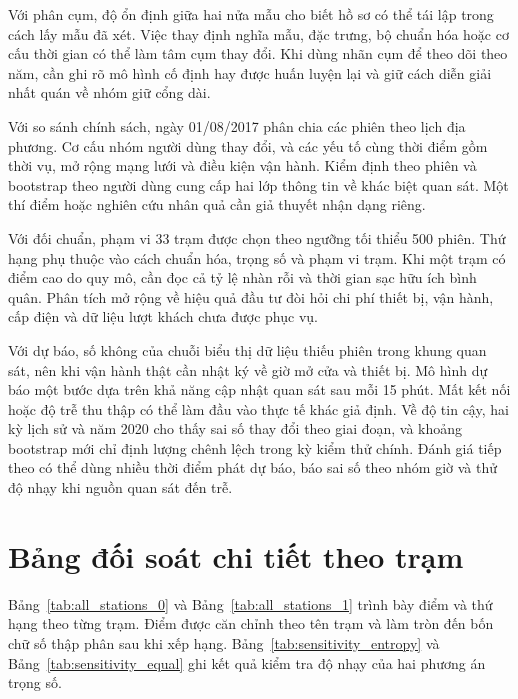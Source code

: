 \documentclass[conference,a4paper]{IEEEtran}
\begin{document}
Với phân cụm, độ ổn định giữa hai nửa mẫu cho biết hồ sơ có thể tái lập trong cách lấy mẫu đã xét. Việc thay định nghĩa mẫu, đặc trưng, bộ chuẩn hóa hoặc cơ cấu thời gian có thể làm tâm cụm thay đổi. Khi dùng nhãn cụm để theo dõi theo năm, cần ghi rõ mô hình cố định hay được huấn luyện lại và giữ cách diễn giải nhất quán về nhóm giữ cổng dài.

Với so sánh chính sách, ngày 01/08/2017 phân chia các phiên theo lịch địa phương. Cơ cấu nhóm người dùng thay đổi, và các yếu tố cùng thời điểm gồm thời vụ, mở rộng mạng lưới và điều kiện vận hành. Kiểm định theo phiên và bootstrap theo người dùng cung cấp hai lớp thông tin về khác biệt quan sát. Một thí điểm hoặc nghiên cứu nhân quả cần giả thuyết nhận dạng riêng.

Với đối chuẩn, phạm vi 33 trạm được chọn theo ngưỡng tối thiểu 500 phiên. Thứ hạng phụ thuộc vào cách chuẩn hóa, trọng số và phạm vi trạm. Khi một trạm có điểm cao do quy mô, cần đọc cả tỷ lệ nhàn rỗi và thời gian sạc hữu ích bình quân. Phân tích mở rộng về hiệu quả đầu tư đòi hỏi chi phí thiết bị, vận hành, cấp điện và dữ liệu lượt khách chưa được phục vụ.

Với dự báo, số không của chuỗi biểu thị dữ liệu thiếu phiên trong khung quan sát, nên khi vận hành thật cần nhật ký về giờ mở cửa và thiết bị. Mô hình dự báo một bước dựa trên khả năng cập nhật quan sát sau mỗi 15 phút. Mất kết nối hoặc độ trễ thu thập có thể làm đầu vào thực tế khác giả định. Về độ tin cậy, hai kỳ lịch sử và năm 2020 cho thấy sai số thay đổi theo giai đoạn, và khoảng bootstrap mới chỉ định lượng chênh lệch trong kỳ kiểm thử chính. Đánh giá tiếp theo có thể dùng nhiều thời điểm phát dự báo, báo sai số theo nhóm giờ và thử độ nhạy khi nguồn quan sát đến trễ.

\appendices
\section{Bảng đối soát chi tiết theo trạm}
Bảng~\ref{tab:all_stations_0} và Bảng~\ref{tab:all_stations_1} trình bày điểm và thứ hạng theo từng trạm. Điểm được căn chỉnh theo tên trạm và làm tròn đến bốn chữ số thập phân sau khi xếp hạng. Bảng~\ref{tab:sensitivity_entropy} và Bảng~\ref{tab:sensitivity_equal} ghi kết quả kiểm tra độ nhạy của hai phương án trọng số.
\end{document}
